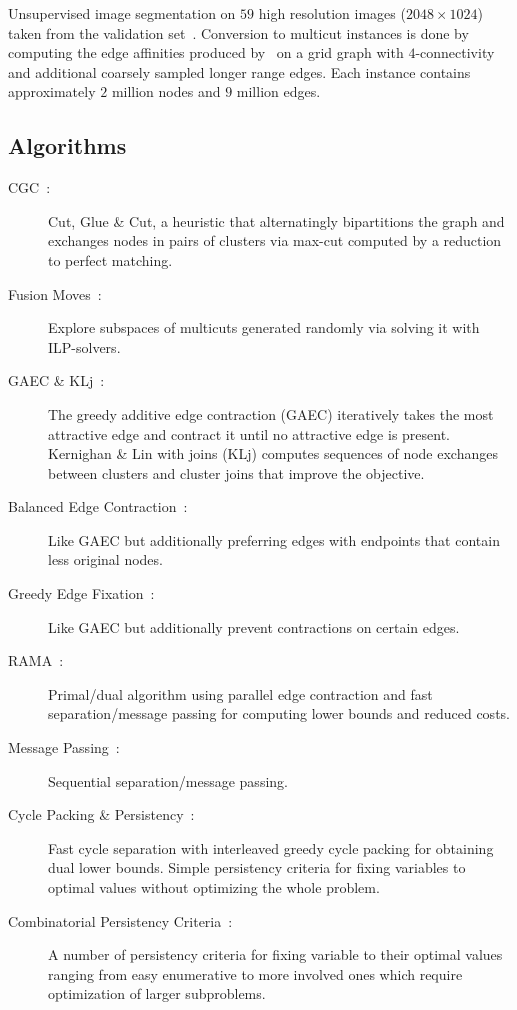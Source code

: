 Unsupervised image segmentation on $59$ high resolution images ($2048 \times 1024$) taken from the validation set~\cite{cordts2016cityscapes}.
Conversion to multicut instances is done by computing the edge affinities produced by~\cite{abbas2021combinatorial} on a grid graph with $4$-connectivity and additional coarsely sampled longer range edges.
Each instance contains approximately $2$ million nodes and $9$ million edges. 

\subsection{Algorithms}
\begin{description}
\item[CGC~\cite{beier2014cut}:] Cut, Glue \& Cut, a heuristic that alternatingly bipartitions the graph and exchanges nodes in pairs of clusters via max-cut computed by a reduction to perfect matching.
\item[Fusion Moves~\cite{beier2017multicut}:] Explore subspaces of multicuts generated randomly via solving it with ILP-solvers.
\item[GAEC \& KLj~\cite{keuper2015efficient}:] The greedy additive edge contraction (GAEC) iteratively takes the most attractive edge and contract it until no attractive edge is present.
Kernighan \& Lin with joins (KLj) computes sequences of node exchanges between clusters and cluster joins that improve the objective.
\item[Balanced Edge Contraction~\cite{kardoost2018solving}:] Like GAEC but additionally preferring edges with endpoints that contain less original nodes.
\item[Greedy Edge Fixation~\cite{levinkov2019comparative}:] Like GAEC but additionally prevent contractions on certain edges.
\item[RAMA~\cite{abbas2021combinatorial}:] Primal/dual algorithm using parallel edge contraction and fast separation/message passing for computing lower bounds and reduced costs.
\item[Message Passing~\cite{swoboda2017message}:] Sequential separation/message passing.
\item[Cycle Packing \& Persistency~\cite{lange2018partial}:] Fast cycle separation with interleaved greedy cycle packing for obtaining dual lower bounds. Simple persistency criteria for fixing variables to optimal values without optimizing the whole problem.
\item[Combinatorial Persistency Criteria~\cite{lange2019combinatorial}:] A number of persistency criteria for fixing variable to their optimal values ranging from easy enumerative to more involved ones which require optimization of larger subproblems.
\end{description}

